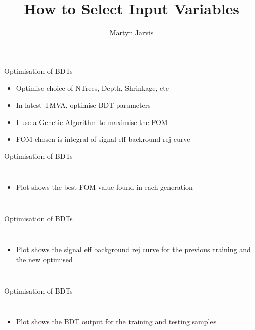 \documentclass[t]{beamer}
\author{Martyn Jarvis}
\title[Input Variables]{How to Select Input Variables}
\begin{document}


\begin{frame}{Optimisation of BDTs}
  \begin{itemize}  
   \item Optimise choice of NTrees, Depth, Shrinkage, etc
   \item In latest TMVA, optimise BDT parameters
   \item I use a Genetic Algorithm to maximise the FOM
   \item FOM chosen is integral of signal eff backround rej curve
   \end{itemize}
\end{frame}

\begin{frame}{Optimisation of BDTs}
  \begin{columns}[c]
  \begin{itemize}
    \item Plot shows the best FOM value found in each generation
  \end{itemize}
  \end{columns}
\end{frame}

\begin{frame}{Optimisation of BDTs}
  \begin{columns}[c]
  \begin{itemize}
    \item Plot shows the signal eff background rej curve for the previous
    training and the new optimised
  \end{itemize}
  \end{columns}
\end{frame}

\begin{frame}{Optimisation of BDTs}
  \begin{columns}[c]
  \begin{itemize}
    \item Plot shows the BDT output for the training and testing samples
  \end{itemize}
  \end{columns}
\end{frame}
\end{document}
